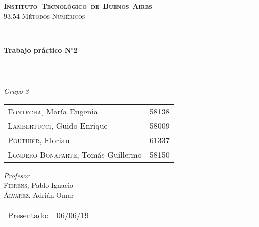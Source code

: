 \begin{titlepage}
\newcommand{\HRule}{\rule{\linewidth}{0.5mm}}
\center
\mbox{\textsc{\LARGE \bfseries {Instituto Tecnológico de Buenos Aires}}}\\[1.5cm]
\textsc{\Large 93.54 Métodos Numéricos}\\[0.5cm]


\HRule \\[0.6cm]
{ \Huge \bfseries Trabajo práctico N$^{\circ}$2}\\[0.4cm] 
\HRule \\[1.5cm]


{\large

\emph{Grupo 3}\\
\vspace{3px}

\begin{tabular}{lr} 	
\textsc{Fontecha}, María Eugenia  & 58138 \\
\textsc{Lambertucci}, Guido Enrique  & 58009 \\
\textsc{Pouthier}, Florian  & 61337 \\
\textsc{Londero Bonaparte}, Tomás Guillermo  & 58150 \\
\end{tabular}

\vspace{20px}

\emph{Profesor}\\
\vspace{3px}
\textsc{Fierens}, Pablo Ignacio\\ 	
\textsc{Álvarez}, Adrián Omar\\ 

\vspace{100px}

\begin{tabular}{ll}

Presentado: & 06/06/19\\

\end{tabular}

}

\vfill

\end{titlepage}
